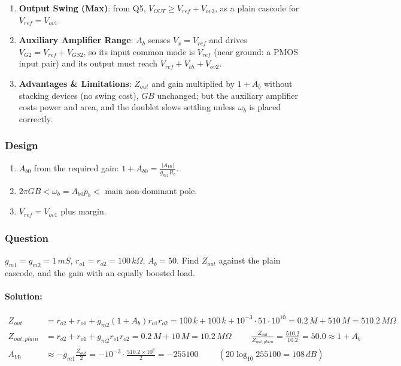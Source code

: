 \begin{enumerate}
    \paragraph{At Output:} (1): \(Z_{out} \approx (1 + A_b) g_{m2} r_{o2} r_{o1}\), falling to \(R_c\) above \(\omega_b\).
  \item \textbf{Output Swing (Max)}: from Q5, \(V_{OUT} \geq V_{ref} + V_{ov2}\), as a plain cascode for
    \(V_{ref} = V_{ov1}\).
  \item \textbf{Auxiliary Amplifier Range}: \(A_b\) senses \(V_x = V_{ref}\) and drives \(V_{G2} = V_{ref} + V_{GS2}\), so its
    input common mode is \(V_{ref}\) (near ground: a PMOS input pair) and its output must reach \(V_{ref} + V_{th} + V_{ov2}\).
  \item \textbf{Advantages \& Limitations}: \(Z_{out}\) and gain multiplied by \(1 + A_b\) without
    stacking devices (no swing cost), \(GB\) unchanged; but the auxiliary amplifier costs power
    and area, and the doublet slows settling unless \(\omega_b\) is placed correctly.
\end{enumerate}

\subsubsection{Design}
\begin{enumerate}
  \item \(A_{b0}\) from the required gain: \(1 + A_{b0} = \frac{|A_{V0}|}{g_{m1} R_c}\).
  \item \(2\pi GB < \omega_b = A_{b0} p_b <\) main non-dominant pole.
  \item \(V_{ref} = V_{ov1}\) plus margin.
\end{enumerate}

\subsubsection{Question}
\(g_{m1} = g_{m2} = 1\,mS\), \(r_{o1} = r_{o2} = 100\,k\Omega\), \(A_b = 50\). Find
\(Z_{out}\) against the plain cascode, and the gain with an equally boosted load.
\paragraph{Solution:}
\begin{align*}
  Z_{out} &= r_{o2} + r_{o1} + g_{m2}(1 + A_b) r_{o1} r_{o2} = 100\,k + 100\,k + 10^{-3} \cdot 51 \cdot 10^{10} = 0.2\,M + 510\,M = 510.2\,M\Omega \\
  Z_{out,plain} &= r_{o2} + r_{o1} + g_{m2} r_{o1} r_{o2} = 0.2\,M + 10\,M = 10.2\,M\Omega \hspace{1cm}
  \frac{Z_{out}}{Z_{out,plain}} = \frac{510.2}{10.2} = 50.0 \approx 1 + A_b \\
  A_{V0} &\approx -g_{m1}\frac{Z_{out}}{2} = -10^{-3} \cdot \frac{510.2 \times 10^{6}}{2} = -255100 \hspace{1cm} (20\log_{10} 255100 = 108\,dB)
\end{align*}

